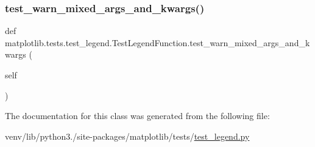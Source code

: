 \subsubsection{\texorpdfstring{test\+\_\+warn\+\_\+mixed\+\_\+args\+\_\+and\+\_\+kwargs()}{test\_warn\_mixed\_args\_and\_kwargs()}}
{\footnotesize\ttfamily def matplotlib.\+tests.\+test\+\_\+legend.\+Test\+Legend\+Function.\+test\+\_\+warn\+\_\+mixed\+\_\+args\+\_\+and\+\_\+kwargs (\begin{DoxyParamCaption}\item[{}]{self }\end{DoxyParamCaption})}



The documentation for this class was generated from the following file\+:\begin{DoxyCompactItemize}
\item 
venv/lib/python3./site-\/packages/matplotlib/tests/\hyperlink{test__legend_8py}{test\+\_\+legend.\+py}\end{DoxyCompactItemize}
